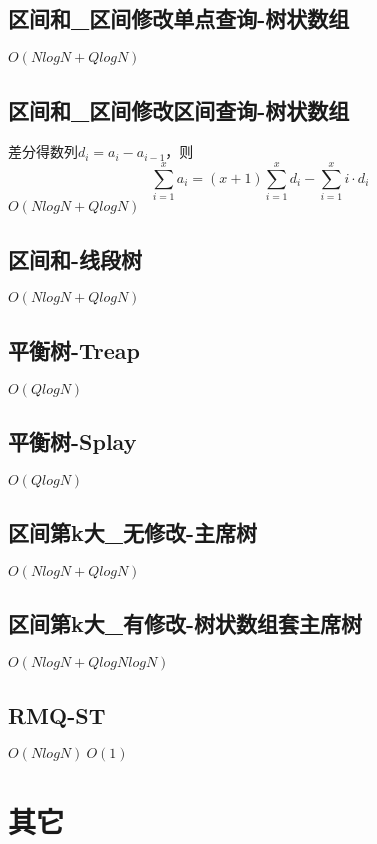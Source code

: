 \documentclass[10pt]{article}
\begin{document}
\subsection{区间和\_区间修改单点查询-树状数组}
$O(NlogN+QlogN)$


\subsection{区间和\_区间修改区间查询-树状数组}
差分得数列$d_i=a_i-a_{i-1}$，则
\begin{equation*}
\sum_{i=1}^xa_i=(x+1)\sum_{i=1}^xd_i-\sum_{i=1}^xi\cdot d_i
\end{equation*}
$O(NlogN+QlogN)$


\subsection{区间和-线段树}
$O(NlogN+QlogN)$


\subsection{平衡树-Treap}
$O(QlogN)$


\subsection{平衡树-Splay}
$O(QlogN)$


\subsection{区间第k大\_无修改-主席树}
$O(NlogN+QlogN)$


\subsection{区间第k大\_有修改-树状数组套主席树}
$O(NlogN+QlogNlogN)$


\subsection{RMQ-ST}
$O(NlogN)~O(1)$

\section{其它}
\end{document}
